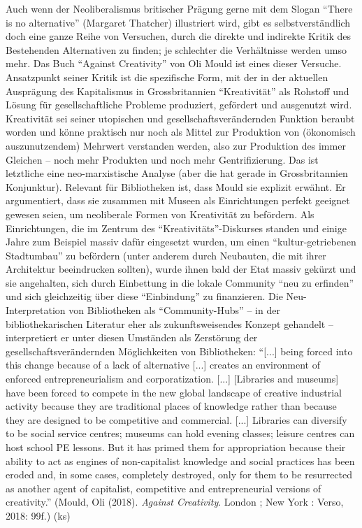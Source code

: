\documentclass[a4paper,
fontsize=11pt,
oneside,
numbers=noperiodatend,
parskip=half-,
bibliography=totoc,
final
]{scrartcl}
\begin{document}
Auch wenn der Neoliberalismus britischer Prägung gerne mit dem Slogan
\enquote{There is no alternative} (Margaret Thatcher) illustriert wird,
gibt es selbstverständlich doch eine ganze Reihe von Versuchen, durch
die direkte und indirekte Kritik des Bestehenden Alternativen zu finden;
je schlechter die Verhältnisse werden umso mehr. Das Buch
\enquote{Against Creativity} von Oli Mould ist eines dieser Versuche.
Ansatzpunkt seiner Kritik ist die spezifische Form, mit der in der
aktuellen Ausprägung des Kapitalismus in Grossbritannien
\enquote{Kreativität} als Rohstoff und Lösung für gesellschaftliche
Probleme produziert, gefördert und ausgenutzt wird. Kreativität sei
seiner utopischen und gesellschaftsverändernden Funktion beraubt worden
und könne praktisch nur noch als Mittel zur Produktion von (ökonomisch
auszunutzendem) Mehrwert verstanden werden, also zur Produktion des
immer Gleichen -- noch mehr Produkten und noch mehr Gentrifizierung. Das
ist letztliche eine neo-marxistische Analyse (aber die hat gerade in
Grossbritannien Konjunktur). Relevant für Bibliotheken ist, dass Mould
sie explizit erwähnt. Er argumentiert, dass sie zusammen mit Museen als
Einrichtungen perfekt geeignet gewesen seien, um neoliberale Formen von
Kreativität zu befördern. Als Einrichtungen, die im Zentrum des
\enquote{Kreativitäts}-Diskurses standen und einige Jahre zum Beispiel
massiv dafür eingesetzt wurden, um einen \enquote{kultur-getriebenen
Stadtumbau} zu befördern (unter anderem durch Neubauten, die mit ihrer
Architektur beeindrucken sollten), wurde ihnen bald der Etat massiv
gekürzt und sie angehalten, sich durch Einbettung in die lokale
Community \enquote{neu zu erfinden} und sich gleichzeitig über diese
\enquote{Einbindung} zu finanzieren. Die Neu-Interpretation von
Bibliotheken als \enquote{Community-Hubs} -- in der bibliothekarischen
Literatur eher als zukunftsweisendes Konzept gehandelt -- interpretiert
er unter diesen Umständen als Zerstörung der gesellschaftsverändernden
Möglichkeiten von Bibliotheken: \enquote{{[}...{]} being forced into
this change because of a lack of alternative {[}...{]} creates an
environment of enforced entrepreneurialism and corporatization.
{[}...{]} {[}Libraries and museums{]} have been forced to compete in the
new global landscape of creative industrial activity because they are
traditional places of knowledge rather than because they are designed to
be competitive and commercial. {[}...{]} Libraries can diversify to be
social service centres; museums can hold evening classes; leisure
centres can host school PE lessons. But it has primed them for
appropriation because their ability to act as engines of non-capitalist
knowledge and social practices has been eroded and, in some cases,
completely destroyed, only for them to be resurrected as another agent
of capitalist, competitive and entrepreneurial versions of creativity.}
(Mould, Oli (2018). \emph{Against Creativity}. London ; New York :
Verso, 2018: 99f.) (ks)
\end{document}
